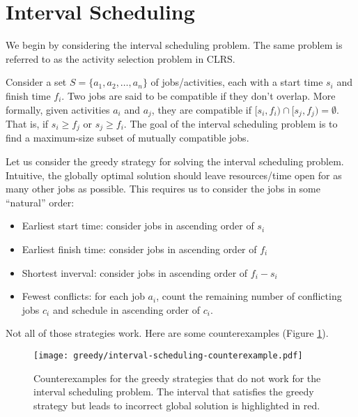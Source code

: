 \section{Interval Scheduling}

We begin by considering the interval scheduling problem. The same problem is referred to as the activity selection problem in CLRS.

Consider a set $S = \{a_1,a_2,\ldots,a_n\}$ of jobs/activities, each with a start time $s_i$ and finish time $f_i$. Two jobs are said to be compatible if they don't overlap. More formally, given activities $a_i$ and $a_j$, they are compatible if $[s_i,f_i) \cap [s_j,f_j) = \emptyset$. That is, if $s_i \geq f_j$ or $s_j \geq f_i$. The goal of the interval scheduling problem is to find a maximum-size subset of mutually compatible jobs.

Let us consider the greedy strategy for solving the interval scheduling problem. Intuitive, the globally optimal solution should leave resources/time open for as many other jobs as possible. This requires us to consider the jobs in some ``natural'' order:

\begin{itemize}
    \item Earliest start time: consider jobs in ascending order of $s_i$
    \item Earliest finish time: consider jobs in ascending order of $f_i$
    \item Shortest inverval: consider jobs in ascending order of $f_i - s_i$ 
    \item Fewest conflicts: for each job $a_i$, count the remaining number of conflicting jobs $c_i$ and schedule in ascending order of $c_i$. 
\end{itemize}

Not all of those strategies work. Here are some counterexamples (Figure \ref{fig:greedy-interval-scheduling-counterexample}).

\begin{figure}[htbp]
    \centering
    \texttt{[image: greedy/interval-scheduling-counterexample.pdf]}

    \hfill

    \caption{Counterexamples for the greedy strategies that do not work for the interval scheduling problem. The interval that satisfies the greedy strategy but leads to incorrect global solution is highlighted in red.}
    \label{fig:greedy-interval-scheduling-counterexample}
\end{figure}

